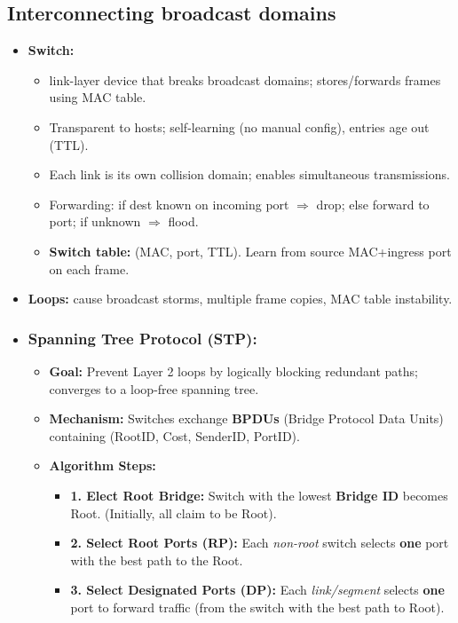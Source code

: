 \subsection{Interconnecting broadcast domains}
\begin{itemize}
	\item \textbf{Switch:}
    \begin{itemize}
        \item link-layer device that breaks broadcast domains; stores/forwards frames using MAC table.
        \item Transparent to hosts; self-learning (no manual config), entries age out (TTL).
        \item Each link is its own collision domain; enables simultaneous transmissions.
        \item Forwarding: if dest known on incoming port $\Rightarrow$ drop; else forward to port; if unknown $\Rightarrow$ flood.
		\item \textbf{Switch table:} (MAC, port, TTL). Learn from source MAC+ingress port on each frame.
    \end{itemize}
    \item \textbf{Loops:} cause broadcast storms, multiple frame copies, MAC table instability.
	\item \subsubsection{Spanning Tree Protocol (STP):} 
	\begin{itemize}
        \item \textbf{Goal:} Prevent Layer 2 loops by logically blocking redundant paths; converges to a loop-free spanning tree.
        \item \textbf{Mechanism:} Switches exchange \textbf{BPDUs} (Bridge Protocol Data Units) containing (RootID, Cost, SenderID, PortID).
        \item \textbf{Algorithm Steps:}
        \begin{itemize}
            \item \textbf{1. Elect Root Bridge:} Switch with the lowest \textbf{Bridge ID} becomes Root. (Initially, all claim to be Root).
            \item \textbf{2. Select Root Ports (RP):} Each \emph{non-root} switch selects \textbf{one} port with the best path to the Root.
            \item \textbf{3. Select Designated Ports (DP):} Each \emph{link/segment} selects \textbf{one} port to forward traffic (from the switch with the best path to Root).

\end{itemize}
\end{itemize}
\end{itemize}
